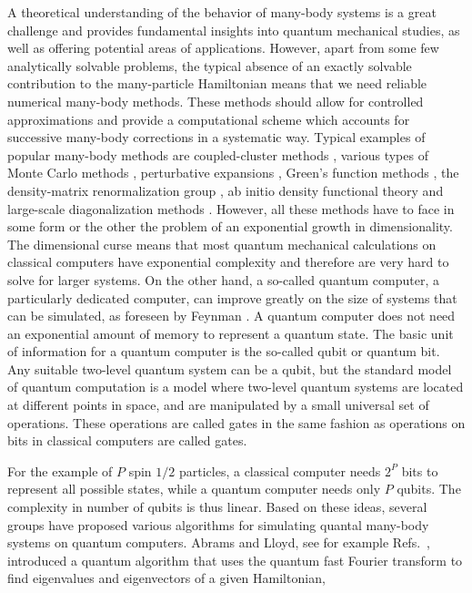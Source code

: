 \documentclass[10pt]{article}
\begin{document}
A theoretical understanding of the behavior of many-body systems
is a  great challenge and provides fundamental insights into quantum 
mechanical studies, as well
as offering potential areas of applications.
However, apart from some few analytically solvable problems,
the typical absence of an exactly solvable contribution to the
many-particle
 Hamiltonian
means that we need reliable numerical many-body methods.
These methods should allow for controlled approximations
and provide a computational scheme which accounts for successive
many-body corrections in a systematic way.
Typical examples of
popular many-body methods are coupled-cluster methods
\cite{bartlett81,helgaker,Dean2004},
various types of
Monte Carlo methods \cite{Pudliner1997,kdl97,ceperley1995},
perturbative expansions \cite{lindgren,mhj95},
Green's function methods \cite{dickhoff,blaizot},
the density-matrix renormalization group \cite{white1992,schollwock2005},
ab initio density functional theory
\cite{bartlett2005,peirs2003,vanneck2006}
and large-scale diagonalization methods
\cite{Whitehead1977,caurier2005,navratil2004,horoi2006}. 
However, all these methods have to face in some form or the other the problem of 
an exponential growth in dimensionality.  The dimensional curse means that most quantum
mechanical calculations on classical computers have exponential
complexity and therefore are very hard to solve for larger systems. On 
the other hand, a so-called 
quantum computer, a particularly dedicated computer,
can improve greatly on the size of systems that can be simulated, as
foreseen by Feynman \cite{feynman1982,feynman1986}. A quantum computer 
does not need
an exponential amount of memory to represent a quantum state.  
The basic unit of information for a  quantum computer 
is the so-called qubit or quantum bit. Any
suitable 
two-level quantum system can be a qubit, but the  
standard model of quantum computation is a model where two-level
quantum systems are located at different points in
space, and are manipulated by a small universal set of  operations.
These operations are called gates in the same fashion as operations on
bits in classical computers are called gates. 

For the example of $P$ spin $1/2$  particles, 
a classical computer needs $2^P$ bits to represent all possible states, while  
a quantum computer needs only $P$ qubits. The complexity in
number of qubits is thus linear.  Based on these ideas, several groups have proposed
various algorithms for simulating quantal many-body systems on quantum computers.
Abrams 
and  Lloyd, see for example Refs.~\cite{lloyd1997,lloyd1999a}, introduced a  
quantum algorithm that uses the quantum fast Fourier transform to find 
eigenvalues and eigenvectors of a given Hamiltonian,
\end{document}

